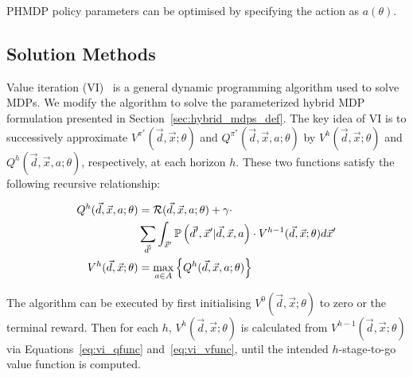 PHMDP policy parameters can be optimised by specifying the action {\footnotesize \Action} as {\footnotesize $ a(\theta) $}.

\subsection{Solution Methods}

Value iteration (VI)~\parencite{Bellman_PU_1957} is a general dynamic programming algorithm used to solve MDPs. We modify the algorithm to solve the parameterized hybrid MDP formulation presented in Section~\ref{sec:hybrid_mdps_def}. The key idea of VI is to successively approximate {\footnotesize $V^{\pi^{*}}(\vec{d}, \vec{x}; \theta)$} and {\footnotesize $Q^{\pi^{*}}(\vec{d}, \vec{x}, a; \theta)$} by {\footnotesize $V^{h}(\vec{d}, \vec{x}; \theta)$} and {\footnotesize $Q^{h}(\vec{d}, \vec{x}, a; \theta)$}, respectively, at each horizon {\footnotesize$h$}. These two functions satisfy the following recursive relationship:

{\footnotesize 
    \abovedisplayskip=0pt
    \belowdisplayskip=0pt
    \begin{align}
        Q^{h}(\vec{d}, \vec{x}, a; \theta) &= \mathcal{R}(\vec{d}, \vec{x}, a; \theta) + \gamma \cdot  \nonumber \\ 
        & \sum_{\vec{d}'} \int_{\vec{x}'} \mathbb{P}\left({\vec{d}', \vec{x}' | \vec{d}, \vec{x}, a}\right) \cdot V^{h-1}(\vec{d}, \vec{x}; \theta) d\vec{x}' \label{eq:vi_qfunc} \\
        V^{h}(\vec{d}, \vec{x}; \theta) &= \max_{a \in A} \left\{ Q^{h}(\vec{d}, \vec{x}, a; \theta) \right\} \label{eq:vi_vfunc}
    \end{align}
}%

The algorithm can be executed by first initialising {\footnotesize $V^{0}(\vec{d}, \vec{x}; \theta)$}  to zero or the terminal reward. Then for each {\footnotesize$h$}, {\footnotesize $V^{h}(\vec{d}, \vec{x}; \theta)$} is calculated from {\footnotesize $V^{h-1}(\vec{d}, \vec{x}; \theta)$} via Equations~\eqref{eq:vi_qfunc} and~\eqref{eq:vi_vfunc}, until the intended $h$-stage-to-go value function is computed. 

